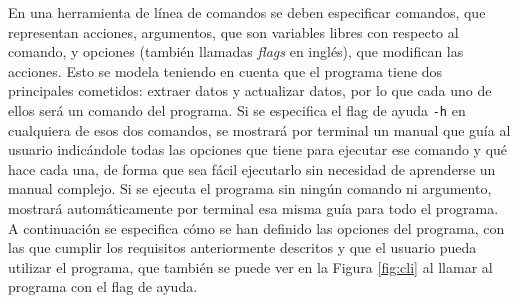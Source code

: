 En una herramienta de línea de comandos se deben especificar comandos, que
representan acciones, argumentos, que son variables libres con respecto al
comando, y opciones (también llamadas \textit{flags} en inglés), que modifican
las acciones. Esto se modela teniendo en cuenta que el programa tiene dos
principales cometidos: extraer datos y actualizar datos, por lo que cada uno de
ellos será un comando del programa. Si se especifica el flag de ayuda \texttt{-h} en 
cualquiera de esos dos comandos, se mostrará por terminal un
manual que guía al usuario indicándole todas las opciones que tiene para
ejecutar ese comando y qué hace cada una, de forma que sea fácil ejecutarlo sin
necesidad de aprenderse un manual complejo. Si se ejecuta el programa sin ningún
comando ni argumento, mostrará automáticamente por terminal esa misma guía para
todo el programa. A continuación se especifica cómo se han definido las opciones
del programa, con las que cumplir los requisitos anteriormente descritos y que el
usuario pueda utilizar el programa, que también se puede ver en la Figura
\ref{fig:cli} al llamar al programa con el flag de ayuda.

